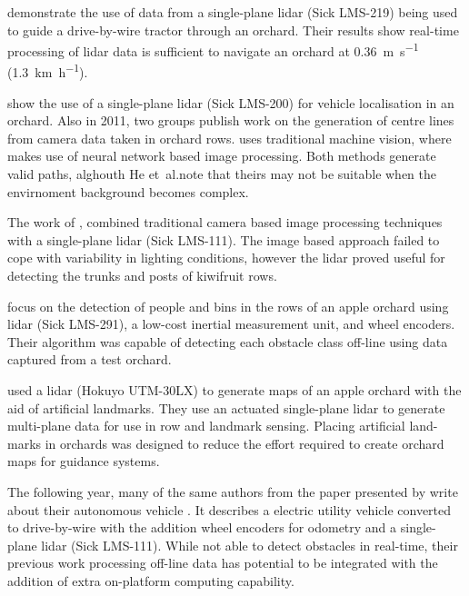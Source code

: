 \documentclass[preprint,authoryear,12pt]{elsarticle}
\begin{document}
        \cite{Barawid2007} demonstrate the use of data from a single-plane lidar (Sick LMS-219) being used to guide a drive-by-wire tractor through an orchard.
        Their results show real-time processing of lidar data is sufficient to navigate an orchard at \SI{0.36}{\meter\per\second} (\SI{1.3}{\kilo\meter\per\hour}).

        \cite{Hansen2011} show the use of a single-plane lidar (Sick LMS-200) for vehicle localisation in an orchard.
        Also in 2011, two groups publish work on the generation of centre lines from camera data taken in orchard rows.
        \cite{He2011} uses traditional machine vision, where \cite{Torres2011} makes use of neural network based image processing.
        Both methods generate valid paths, alghouth He et~al.\@ note that theirs may not be suitable when the envirnoment background becomes complex.

        The work of \cite{Scarfe2012}, combined traditional camera based image processing techniques with a single-plane lidar (Sick LMS-111).
        The image based approach failed to cope with variability in lighting conditions, however the lidar proved useful for detecting the trunks and posts of kiwifruit rows.

        \cite{Freitas2012} focus on the detection of people and bins in the rows of an apple orchard using lidar (Sick LMS-291), a low-cost inertial measurement unit, and wheel encoders.
        Their algorithm was capable of detecting each obstacle class off-line using data captured from a test orchard.

        \cite{Zhang2014} used a lidar (Hokuyo UTM-30LX) to generate maps of an apple orchard with the aid of artificial landmarks.
        They use an actuated single-plane lidar to generate multi-plane data for use in row and landmark sensing.
        Placing artificial land-marks in orchards was designed to reduce the effort required to create orchard maps for guidance systems.

        The following year, many of the same authors from  the paper presented by \cite{Zhang2014} write about their autonomous vehicle \citep{Bergerman2015}.
        It describes a electric utility vehicle converted to drive-by-wire with the addition wheel encoders for odometry and a single-plane lidar (Sick LMS-111).
        While not able to detect obstacles in real-time, their previous work processing off-line data \citep{Freitas2012} has potential to be integrated with the addition of extra on-platform computing capability.
\end{document}
